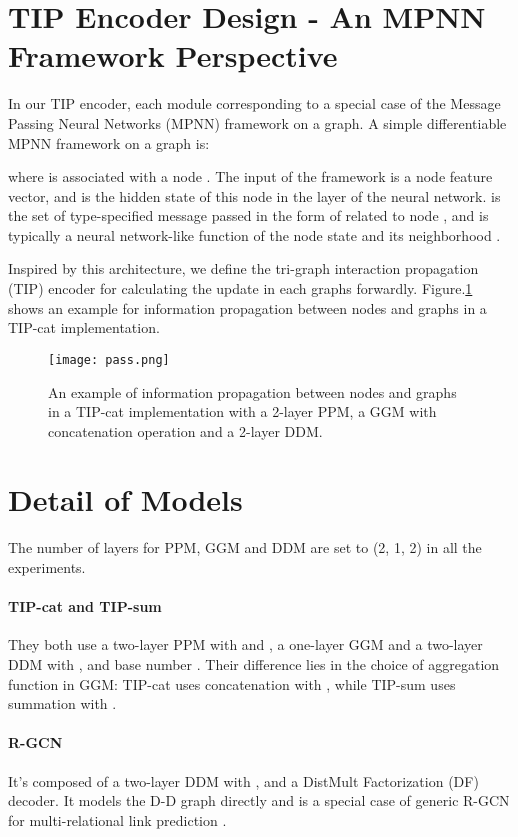 \documentclass{article}
\begin{document}
\section{TIP Encoder Design - An MPNN Framework Perspective}
In our TIP encoder, each module corresponding to a special case of the Message Passing Neural Networks (MPNN) framework \cite{message} on a graph. A simple differentiable MPNN framework on a graph  is:
	
where  is associated with a node . The input of the framework  is a node feature vector, and  is the hidden state of this node in the  layer of the neural network.  is the set of type-specified message passed in the form of  related to node , and  is typically a neural network-like function of the node state  and its neighborhood . 

Inspired by this architecture, we define the  tri-graph interaction propagation (TIP) encoder for calculating the update in each graphs forwardly. Figure.\ref{fig:pass} shows an example for information propagation between nodes and graphs in a TIP-cat implementation.

\begin{figure}[ht]
	\centering
	\texttt{[image: pass.png]}
	\caption{An example of information propagation between nodes and graphs in a TIP-cat implementation with a 2-layer PPM, a GGM with concatenation operation and a 2-layer DDM. }
	\label{fig:pass}
\end{figure}


\section{Detail of Models}

The number of layers for PPM, GGM and DDM are set to (2, 1, 2) in all the experiments.

\paragraph{TIP-cat and TIP-sum} They both use a two-layer PPM with  and , a one-layer GGM and a two-layer DDM with ,  and base number . Their difference lies in the choice of aggregation function in GGM: TIP-cat uses concatenation with , while TIP-sum uses summation with . 

\paragraph{R-GCN} It's composed of a two-layer DDM with ,  and a DistMult Factorization (DF) decoder. It models the D-D graph directly and is a special case of generic R-GCN for multi-relational link prediction \cite{rgcn}.
\end{document}

